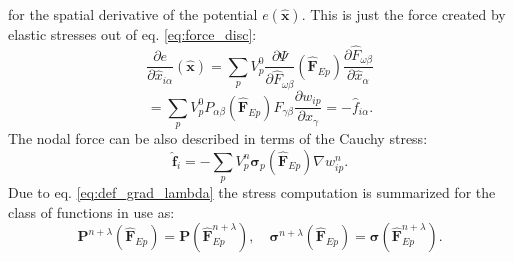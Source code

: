 \documentclass[m,times]{cgMA}
\begin{document}
for the spatial derivative of the potential $e(\boldsymbol{\hat{x}})$. This is just the force created by elastic stresses out of eq. \ref{eq:force_disc}:
$$
  \frac{\partial e}{\partial \hat{x}_{i\alpha}}(\hat{\boldsymbol{x}})
  = \sum_p V^0_p \frac{\partial \Psi}{\partial \hat{F}_{\omega\beta}}(\hat{\boldsymbol{F}}_{Ep})\frac{\partial \hat{F}_{\omega\beta}}{\partial \hat{x}_\alpha}
  $$
  \begin{equation}\label{eq:nodal_force}
  = \sum_p V^0_p P_{\alpha\beta}(\hat{\boldsymbol{F}}_{Ep})F_{\gamma\beta}\frac{\partial w_{ip}}{\partial x_\gamma} = -\hat{f}_{i\alpha}.
\end{equation}
The nodal force can be also described in terms of the Cauchy stress:
\begin{equation}
  \boldsymbol{\hat{f}}_i = - \sum_p V^n_p \boldsymbol{\sigma}_p(\boldsymbol{\hat{F}}_{Ep})\nabla{w^n_{ip}}.
 \end{equation}
Due to eq. \ref{eq:def_grad_lambda} the stress computation is summarized for the class of functions in use as:
\begin{equation}
  \boldsymbol{P}^{n+\lambda}(\hat{\boldsymbol{F}}_{Ep}) = \boldsymbol{P}(\hat{\boldsymbol{F}}^{n+\lambda}_{Ep}),
  \quad
  \boldsymbol{\sigma}^{n+\lambda}(\hat{\boldsymbol{F}}_{Ep}) = \boldsymbol{\sigma}(\hat{\boldsymbol{F}}^{n+\lambda}_{Ep}).
\end{equation}
\cite{MPM:COURSE}\cite{MPM:APIC}
\end{document}
